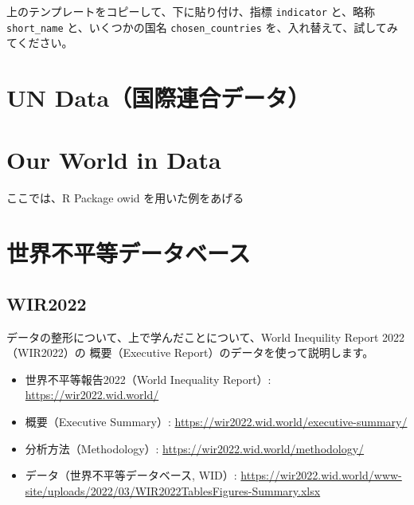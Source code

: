 \documentclass[
  xelatex, ja=standard]{bxjsbook}
\providecommand{\tightlist}{%
  \setlength{\itemsep}{0pt}\setlength{\parskip}{0pt}}
\theoremstyle{definition}
\theoremstyle{definition}
\theoremstyle{definition}
\theoremstyle{definition}
\theoremstyle{remark}
\begin{document}
上のテンプレートをコピーして、下に貼り付け、指標 \texttt{indicator} と、略称 \texttt{short\_name} と、いくつかの国名 \texttt{chosen\_countries} を、入れ替えて、試してみてください。

\hypertarget{un}{%
\chapter{UN Data（国際連合データ）}\label{un}}

\hypertarget{owid}{%
\chapter{Our World in Data}\label{owid}}

ここでは、R Package owid を用いた例をあげる

\hypertarget{wid}{%
\chapter{世界不平等データベース}\label{wid}}

\hypertarget{wir2022}{%
\section{WIR2022}\label{wir2022}}

データの整形について、上で学んだことについて、World Inequility Report 2022（WIR2022）の 概要（Executive Report）のデータを使って説明します。

\begin{itemize}
\tightlist
\item
  世界不平等報告2022（World Inequality Report）: \url{https://wir2022.wid.world/}
\item
  概要（Executive Summary）: \url{https://wir2022.wid.world/executive-summary/}
\item
  分析方法（Methodology）: \url{https://wir2022.wid.world/methodology/}
\item
  データ（世界不平等データベース, WID）: \url{https://wir2022.wid.world/www-site/uploads/2022/03/WIR2022TablesFigures-Summary.xlsx}
\end{itemize}
\end{document}
